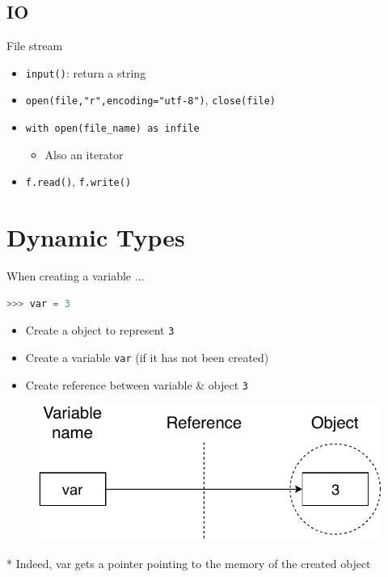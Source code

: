 \documentclass{../TexTemplate/myslide}
\begin{document}
\subsection{IO}
\begin{frame}[fragile]{File stream}
\begin{itemize}
	\item \verb'input()': return a string
	\item \verb;open(file,"r",encoding="utf-8");, \verb'close(file)'
	\item \verb'with open(file_name) as infile'
	\begin{itemize}
		\item Also an iterator
	\end{itemize}
	\item \verb'f.read()', \verb'f.write()'
\end{itemize}
\end{frame}

\section{Dynamic Types}
\begin{frame}
\sectionpage
\end{frame}

\begin{frame}[fragile]{When creating a variable $\ldots$}
\begin{lstlisting}[language=python]
>>> var = 3
\end{lstlisting}
\begin{itemize}
	\item Create a object to represent \verb'3'
	\item Create a variable \verb'var' (if it has not been created)
	\item Create reference between variable \& object \verb'3'
\end{itemize}
\begin{figure}
\centering
\includegraphics[width=0.5\linewidth]{fig/python-reference.pdf}
\end{figure}
* Indeed, var gets a pointer pointing to the memory of the created object
\end{frame}
\end{document}

